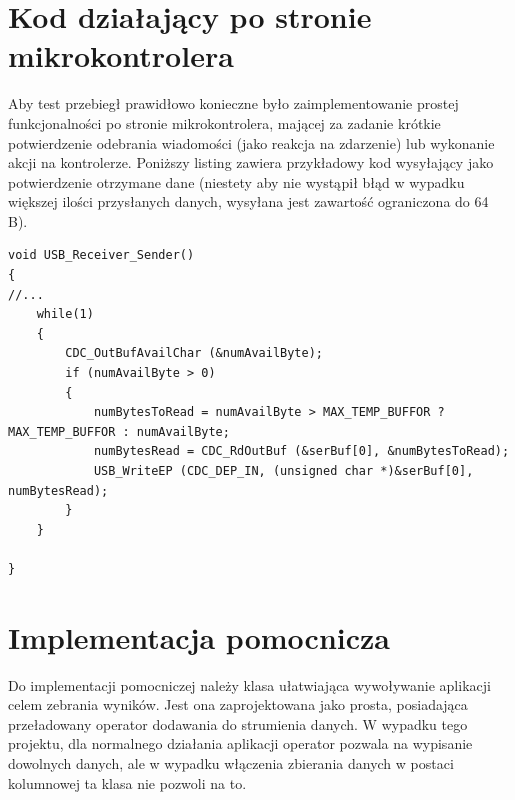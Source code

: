 \documentclass{BscUS}
\begin{document}
\section{Kod działający po stronie mikrokontrolera}
Aby test przebiegł prawidłowo konieczne było zaimplementowanie prostej funkcjonalności po stronie mikrokontrolera, mającej za zadanie krótkie potwierdzenie odebrania wiadomości (jako reakcja na zdarzenie) lub wykonanie akcji na kontrolerze. Poniższy listing zawiera przykładowy kod wysyłający jako potwierdzenie otrzymane dane (niestety aby nie wystąpił błąd w wypadku większej ilości przysłanych danych, wysyłana jest zawartość ograniczona do 64 B). \cite{embeddedC, embeddedSystems, bootstrapLinUSB}
\begin{lstlisting}[caption={Funkcja USB\_Receiver\_Sender},label={lst:FUSBSenderReceiver}]
void USB_Receiver_Sender()
{
//...
	while(1)
	{
		CDC_OutBufAvailChar (&numAvailByte);
		if (numAvailByte > 0)
		{
		  	numBytesToRead = numAvailByte > MAX_TEMP_BUFFOR ? MAX_TEMP_BUFFOR : numAvailByte;
		    numBytesRead = CDC_RdOutBuf (&serBuf[0], &numBytesToRead);
		    USB_WriteEP (CDC_DEP_IN, (unsigned char *)&serBuf[0], numBytesRead);
		}
	}

}
\end{lstlisting}

\section{Implementacja pomocnicza}
\label{sch:additionalImplementation}
Do implementacji pomocniczej należy klasa ułatwiająca wywoływanie aplikacji celem zebrania wyników. Jest ona zaprojektowana jako prosta, posiadająca przeładowany operator dodawania do strumienia danych. W wypadku tego projektu, dla normalnego działania aplikacji operator pozwala na wypisanie dowolnych danych, ale w wypadku włączenia zbierania danych w postaci kolumnowej ta klasa nie pozwoli na to.
\end{document}
